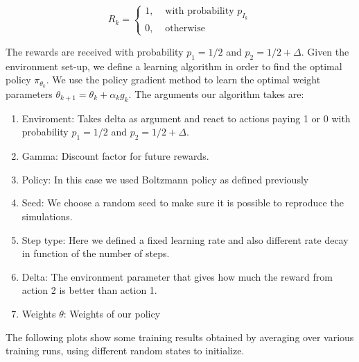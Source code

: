 \documentclass[a4paper, 11pt]{article} %
\begin{document}
$$
R_{k}=\left\{\begin{array}{ll}{1,} & {\text { with probability } p_{I_{k}}} \\ {0,} & {\text { otherwise }}\end{array}\right.
$$

The rewards are received with probability $p_{1}=1 / 2$ and $p_{2}=1 / 2+\Delta$. Given the environment set-up, we define a learning algorithm in order to find the optimal policy $\pi_{\theta_{k}}$. We use the policy gradient method to learn the optimal weight parameters $\theta_{k+1}=\theta_{k}+\alpha_{k} g_{k}$. The arguments our algorithm takes are:

\begin{enumerate}
	\item Enviroment: Takes delta as argument and react to actions paying 1 or 0 with probability $p_{1}=1 / 2$ and $p_{2}=1 / 2+\Delta$.
	\item Gamma: Discount factor for future rewards.
	\item Policy: In this case we used Boltzmann policy as defined previously
	\item Seed: We choose a random seed to make sure it is possible to reproduce the simulations.
	\item Step type: Here we defined a fixed learning rate and also different rate decay in function of the number of steps.
	\item Delta: The environment parameter that gives how much the reward from action 2 is better than action 1.
	\item Weights $\theta$: Weights of our policy
\end{enumerate}

The following plots show some training results obtained by averaging over various training runs, using different random states to initialize.
\end{document}

